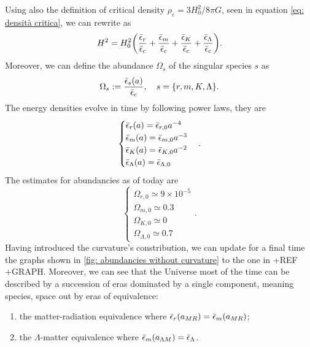 Using also the definition of critical density $\rho_c = 3H_0^2/8\pi G$, seen in equation \eqref{eq: densità critica}, we can rewrite as
\begin{equation}
    H^2 = H_0^2\bigg(\frac{\bar{\epsilon}_r}{\bar{\epsilon}_c} + \frac{\bar{\epsilon}_m}{\bar{\epsilon}_c} + \frac{\bar{\epsilon}_K}{\bar{\epsilon}_c} + \frac{\bar{\epsilon}_\Lambda}{\bar{\epsilon}_c}\bigg).
\end{equation}
Moreover, we can define the abundance $\Omega_s$ of the singular species $s$ as 
\begin{equation}
\label{eq: abundance of a species}
    \Omega_s := \frac{\bar{\epsilon}_s(a)}{\bar{\epsilon}_c},\quad s = \{r,m,K,\Lambda\}.
\end{equation}
The energy densities evolve in time by following power laws, they are 
\begin{equation}
    \begin{cases}
        \bar{\epsilon}_r(a) = \bar{\epsilon}_{r,0}a^{-4} \\
        \bar{\epsilon}_m(a) = \bar{\epsilon}_{m,0}a^{-3} \\
        \bar{\epsilon}_K(a) = \bar{\epsilon}_{K,0}a^{-2} \\
        \bar{\epsilon}_\Lambda(a) = \bar{\epsilon}_{\Lambda,0}
    \end{cases}.
\end{equation}
The estimates for abundancies as of today are 
\begin{equation}
    \begin{cases}
        \Omega_{r,0} \simeq 9 \times 10^{-5} \\
        \Omega_{m,0} \simeq 0.3 \\
        \Omega_{K,0} \simeq 0 \\
        \Omega_{\Lambda,0} \simeq 0.7
    \end{cases}.
\end{equation}
Having introduced the curvature's constribution, we can update for a final time the graphs shown in \ref{fig: abundancies without curvature} to the one in +REF +GRAPH. Moreover, we can see that the Universe most of the time can be described by a succession of eras dominated by a single component, meaning species, space out by eras of equivalence: 
\begin{enumerate}
    \item the matter-radiation equivalence where $\bar{\epsilon}_r(a_{MR}) = \bar{\epsilon}_m(a_{MR})$;
    \item the $\Lambda$-matter equivalence where $\bar{\epsilon}_m(a_{\Lambda M}) = \bar{\epsilon}_\Lambda$.
\end{enumerate}
